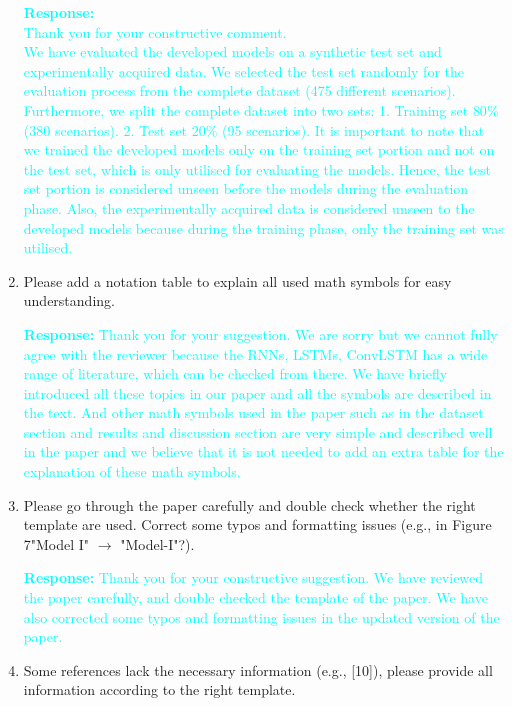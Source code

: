 \documentclass[11pt,a2paper]{report}
\begin{document}
\begin{enumerate}
		\textcolor{Cyan}{
			\textbf{Response:\\}
			Thank you for your constructive comment. \\
			We have evaluated the developed models on a synthetic test set and experimentally acquired data.
			We selected the test set randomly for the evaluation process from the complete dataset (475 different scenarios).
			Furthermore, we split the complete dataset into two sets: 
			1. Training set $80\%$ (380 scenarios). 
			2. Test set $20\%$ (95 scenarios).
			It is important to note that we trained the developed models only on the training set portion and not on the test set, which is only utilised for evaluating the models.
			Hence, the test set portion is considered unseen before the models during the evaluation phase.
			Also, the experimentally acquired data is considered unseen to the developed models because during the training phase, only the training set was utilised.
		}
	
			\item Please add a notation table to explain all used math symbols 
			for easy understanding.
	
	\textcolor{Cyan}{
		\textbf{Response:}
	Thank you for your suggestion.
	We are sorry but we cannot fully agree with the reviewer because the RNNs, 
	LSTMs, ConvLSTM has a wide range of literature, which can be checked from 
	there. 
	We have briefly introduced all these topics in our paper and all 
	the symbols are described in the text.
    And other math symbols used in the paper such as in the dataset section and 
    results and discussion section are very simple and described well in the 
    paper and we believe that it is not needed to add an extra table for the 
    explanation of these math symbols.}	

			\item Please go through the paper carefully and double check 
			whether the right template are used. Correct some typos and 
			formatting issues (e.g., in Figure 7"Model I" $\to$ "Model-I"?).

    \textcolor{Cyan}{
	\textbf{Response:}
	Thank you for your constructive suggestion.
	We have reviewed the paper carefully, and double checked the template of 
	the paper.
	We have also corrected some typos and formatting issues in the updated 
	version of the paper.
}

			\item Some references lack the necessary information (e.g., [10]), 
			please provide all information according to the right template.


\end{enumerate}
\end{document}
